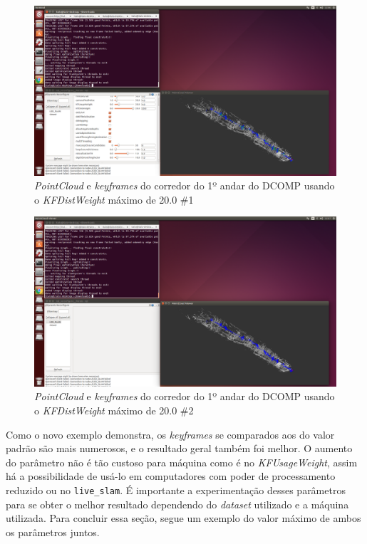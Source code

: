 \begin{figure}[H]
	\centering
		\includegraphics[width= \textwidth]{Imagens/figura3-38.png}
	\caption{\textit{PointCloud} e \textit{keyframes} do corredor do 1º andar do DCOMP usando o \textit{KFDistWeight} máximo de 20.0 \#1}
	\label{fig3:36}
\end{figure}

\begin{figure}[H]
	\centering
		\includegraphics[width= \textwidth]{Imagens/figura3-39.png}
	\caption{\textit{PointCloud} e \textit{keyframes} do corredor do 1º andar do DCOMP usando o \textit{KFDistWeight} máximo de 20.0 \#2}
	\label{fig3:37}
\end{figure}

Como o novo exemplo demonstra, os \textit{keyframes} se comparados aos do valor padrão são mais numerosos, e o resultado geral também foi melhor. O aumento do parâmetro não é tão custoso para máquina como é no \textit{KFUsageWeight}, assim há a possibilidade de usá-lo em computadores com poder de processamento reduzido ou no \texttt{live\_slam}. É importante a experimentação desses parâmetros para se obter o melhor resultado dependendo do \textit{dataset} utilizado e a máquina utilizada. Para concluir essa seção, segue um exemplo do valor máximo de ambos os parâmetros juntos.

